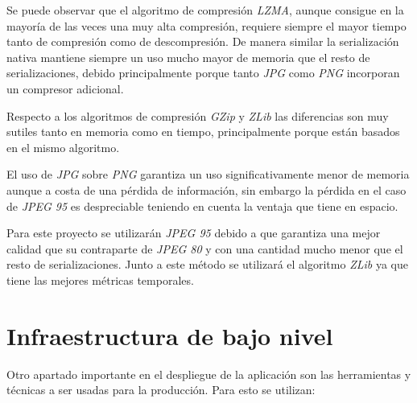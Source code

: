 Se puede observar que el algoritmo de compresión \textit{LZMA}, aunque consigue en la mayoría de las veces una muy alta compresión, requiere siempre el mayor tiempo tanto de compresión como de descompresión. De manera similar la serialización nativa mantiene siempre un uso mucho mayor de memoria que el resto de serializaciones, debido principalmente porque tanto \textit{JPG} como \textit{PNG} incorporan un compresor adicional.

Respecto a los algoritmos de compresión \textit{GZip} y \textit{ZLib} las diferencias son muy sutiles tanto en memoria como en tiempo, principalmente porque están basados en el mismo algoritmo.

El uso de \textit{JPG} sobre \textit{PNG} garantiza un uso significativamente menor de memoria aunque a costa de una pérdida de información, sin embargo la pérdida en el caso de \textit{JPEG 95} es despreciable teniendo en cuenta la ventaja que tiene en espacio.

Para este proyecto se utilizarán \textit{JPEG 95} debido a que garantiza una mejor calidad que su contraparte de \textit{JPEG 80} y con una cantidad mucho menor que el resto de serializaciones. Junto a este método se utilizará el algoritmo \textit{ZLib} ya que tiene las mejores métricas temporales.


\section{Infraestructura de bajo nivel}\label{sec:bajonivel}

Otro apartado importante en el despliegue de la aplicación son las herramientas y técnicas a ser usadas para la producción. Para esto se utilizan:

